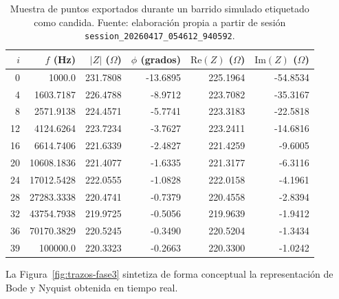 \documentclass[11pt,a4paper,spanish]{book}
\begin{document}
\begin{table}[ht]
	\centering
	\scriptsize
	\begin{tabular}{r r r r r r}
		\hline\hline
		$i$ & $f$ (Hz)   & $|Z|$ ($\Omega$) & $\phi$ (grados) & $\mathrm{Re}(Z)$ ($\Omega$) & $\mathrm{Im}(Z)$ ($\Omega$) \\ [0.5ex]
		\hline
		0   & 1000.0     & 231.7808         & -13.6895        & 225.1964                    & -54.8534                    \\
		4   & 1603.7187  & 226.4788         & -8.9712         & 223.7082                    & -35.3167                    \\
		8   & 2571.9138  & 224.4571         & -5.7741         & 223.3183                    & -22.5818                    \\
		12  & 4124.6264  & 223.7234         & -3.7627         & 223.2411                    & -14.6816                    \\
		16  & 6614.7406  & 221.6339         & -2.4827         & 221.4259                    & -9.6005                     \\
		20  & 10608.1836 & 221.4077         & -1.6335         & 221.3177                    & -6.3116                     \\
		24  & 17012.5428 & 222.0555         & -1.0828         & 222.0158                    & -4.1961                     \\
		28  & 27283.3338 & 220.4741         & -0.7379         & 220.4558                    & -2.8394                     \\
		32  & 43754.7938 & 219.9725         & -0.5056         & 219.9639                    & -1.9412                     \\
		36  & 70170.3829 & 220.5245         & -0.3490         & 220.5204                    & -1.3434                     \\
		39  & 100000.0   & 220.3323         & -0.2663         & 220.3300                    & -1.0242                     \\
		\hline
	\end{tabular}
	\caption[Muestra de puntos en barrido candida]{Muestra de puntos exportados durante un barrido simulado etiquetado como candida. Fuente: elaboraci\'{o}n propia a partir de sesi\'{o}n \texttt{session\_20260417\_054612\_940592}.}
	\label{tab:muestra-candida}
\end{table}

La Figura~\ref{fig:trazos-fase3} sintetiza de forma conceptual la representaci\'{o}n de Bode y Nyquist obtenida en tiempo real.
\end{document}
